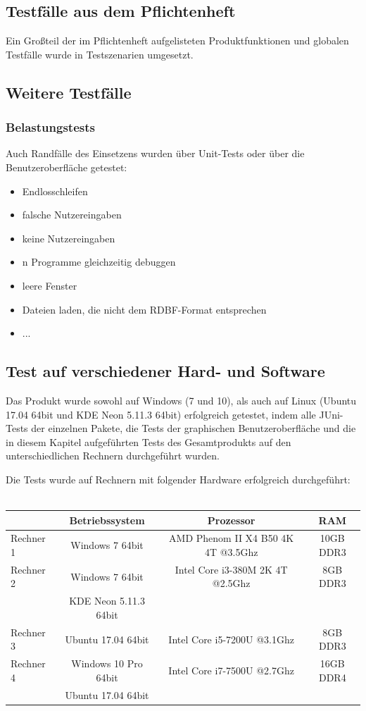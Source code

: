 \documentclass[parskip=full]{scrartcl}
\begin{document}
\subsection{Testfälle aus dem Pflichtenheft}
Ein Großteil der im Pflichtenheft aufgelisteten Produktfunktionen und globalen Testfälle wurde in Testszenarien umgesetzt. %

\subsection{Weitere Testfälle}

\subsubsection{Belastungstests}
\label{stress}
Auch Randfälle des Einsetzens wurden über Unit-Tests oder über die Benutzeroberfläche getestet: 
\begin{itemize}
\item Endlosschleifen
\item falsche Nutzereingaben
\item keine Nutzereingaben
\item n Programme gleichzeitig debuggen
\item leere Fenster
\item Dateien laden, die nicht dem RDBF-Format entsprechen
\item ...

\end{itemize}

\subsection{Test auf verschiedener Hard- und Software}

Das Produkt wurde sowohl auf Windows (7 und 10), als auch auf Linux (Ubuntu 17.04 64bit und KDE Neon 5.11.3 64bit) erfolgreich getestet, indem alle JUni-Tests der einzelnen Pakete, die Tests der graphischen Benutzeroberfläche und die in diesem Kapitel aufgeführten Tests des Gesamtprodukts auf den unterschiedlichen Rechnern durchgeführt wurden.

Die Tests wurde auf Rechnern mit folgender Hardware erfolgreich durchgeführt: \\ \\
\begin{tabular}{l||c|c|c}
   	& Betriebssystem & Prozessor & RAM \\
	\hline
	\hline
	Rechner 1 & Windows 7 64bit & AMD Phenom II X4 B50 4K 4T @3.5Ghz & 10GB DDR3 \\
	Rechner 2 & Windows 7 64bit & Intel Core i3-380M 2K 4T @2.5Ghz & 8GB DDR3 \\
	 & KDE Neon 5.11.3 64bit &  \\
	Rechner 3 & Ubuntu 17.04 64bit & Intel Core i5-7200U @3.1Ghz & 8GB DDR3 \\
	Rechner 4 & Windows 10 Pro 64bit & Intel Core i7-7500U @2.7Ghz & 16GB DDR4\\
		& Ubuntu 17.04 64bit\\
\end{tabular}
\end{document}
